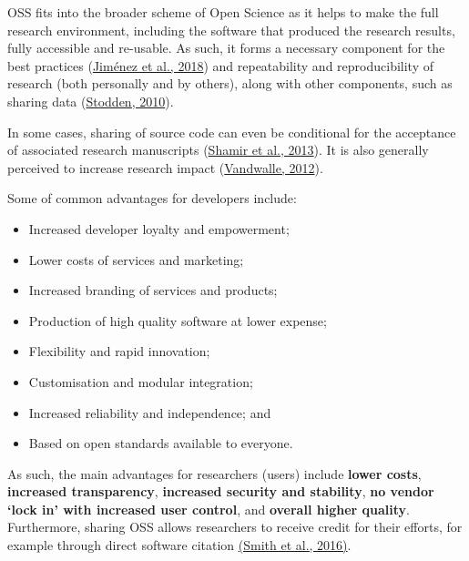 \documentclass[]{book}
\begin{document}
OSS fits into the broader scheme of Open Science as it helps to make the full research environment, including the software that produced the research results, fully accessible and re-usable. As such, it forms a necessary component for the best practices (\href{https://github.com/OpenScienceMOOC/Module-5-Open-Research-Software-and-Open-Source/blob/master/Reading\%20Material_Open\%20Source\%20and\%20Open\%20Research\%20Software/Jim\%C3\%A9nez\%20et\%20al.\%2C\%202018.pdf}{Jiménez et al., 2018}) and repeatability and reproducibility of research (both personally and by others), along with other components, such as sharing data (\href{https://github.com/OpenScienceMOOC/Module-5-Open-Research-Software-and-Open-Source/blob/master/Reading\%20Material_Open\%20Source\%20and\%20Open\%20Research\%20Software/Stodden\%2C\%202010.pdf}{Stodden, 2010}).

In some cases, sharing of source code can even be conditional for the acceptance of associated research manuscripts (\href{https://github.com/OpenScienceMOOC/Module-5-Open-Research-Software-and-Open-Source/blob/master/Reading\%20Material_Open\%20Source\%20and\%20Open\%20Research\%20Software/Shamir\%20et\%20al.\%2C\%202013.pdf}{Shamir et al., 2013}). It is also generally perceived to increase research impact (\href{https://github.com/OpenScienceMOOC/Module-5-Open-Research-Software-and-Open-Source/blob/master/Reading\%20Material_Open\%20Source\%20and\%20Open\%20Research\%20Software/Vandewalle\%2C\%202012.pdf}{Vandwalle, 2012}).

Some of common advantages for developers include:

\begin{itemize}
\item
  Increased developer loyalty and empowerment;
\item
  Lower costs of services and marketing;
\item
  Increased branding of services and products;
\item
  Production of high quality software at lower expense;
\item
  Flexibility and rapid innovation;
\item
  Customisation and modular integration;
\item
  Increased reliability and independence; and
\item
  Based on open standards available to everyone.
\end{itemize}

As such, the main advantages for researchers (users) include \textbf{lower costs}, \textbf{increased transparency}, \textbf{increased security and stability}, \textbf{no vendor `lock in' with increased user control}, and \textbf{overall higher quality}. Furthermore, sharing OSS allows researchers to receive credit for their efforts, for example through direct software citation \href{https://github.com/OpenScienceMOOC/Module-5-Open-Research-Software-and-Open-Source/blob/master/Reading\%20Material_Open\%20Source\%20and\%20Open\%20Research\%20Software/Smith\%20et\%20al.\%2C\%202016.pdf}{(Smith et al., 2016)}.
\end{document}
